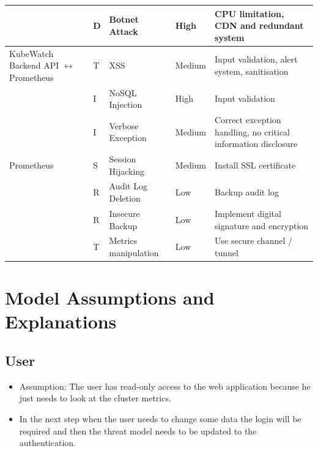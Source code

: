 \begin{longtable}[h!]{p{2.1cm} p{1.8cm} p{3cm} p{2cm} p{3.5cm}}
                        & D & Botnet Attack & High & CPU limitation, CDN and redundant system \\
    \hline
    KubeWatch Backend API \(\leftrightarrow\) Prometheus
                        & T & XSS & Medium & Input validation, alert system, sanitisation \\
                        & I & NoSQL Injection & High & Input validation \\
                        & I & Verbose Exception & Medium & Correct exception handling, no critical information disclosure \\
    \hline
    Prometheus          & S & Session Hijacking & Medium & Install SSL certificate \\
                        & R & Audit Log Deletion & Low & Backup audit log \\
                        & R & Insecure Backup & Low & Implement digital signature and encryption \\
                        & T & Metrics manipulation & Low & Use secure channel / tunnel \\
    \hline
\end{longtable}


\section{Model Assumptions and Explanations}

\subsection{User}
\begin{itemize}
    \item Assumption: The user has read-only access to the web application because he just needs to look at the cluster metrics.
    \item In the next step when the user needs to change some data the login will be required and then the threat model needs to be updated to the authentication.
\end{itemize}


